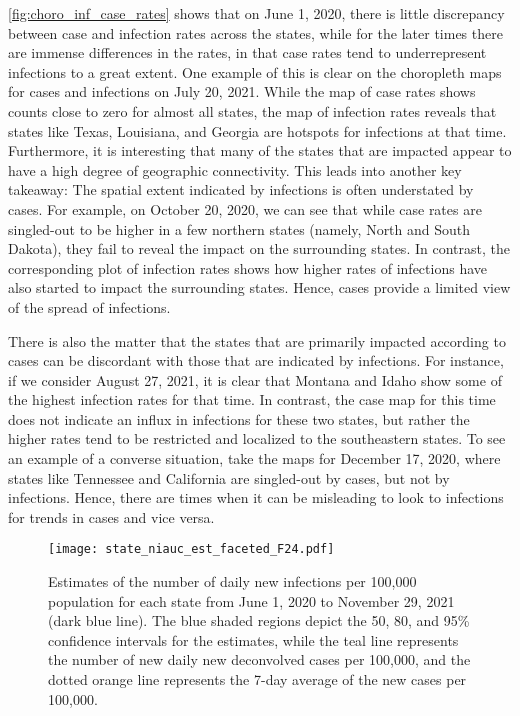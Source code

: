 \autoref{fig:choro_inf_case_rates} shows that on June 1, 2020, there is little
discrepancy between case and infection rates across the states, while for the
later times there are immense differences in the rates, in that case rates tend
to underrepresent infections to a great extent.
One example of this is clear on the choropleth maps for cases and infections on July 20, 2021. While the map of case rates shows counts close to zero for almost all states, the map of infection rates reveals that states like Texas, Louisiana, and Georgia are hotspots for infections at that time. Furthermore, it is interesting that many of the states that are impacted appear to have a high degree of geographic connectivity. 
This leads into another key takeaway: The spatial extent indicated by infections is often understated by cases. For example, on October 20, 2020, we can see that while case rates are singled-out to be higher in a few northern states (namely, North and South Dakota), they fail to reveal the impact on the surrounding states. In contrast, the corresponding plot of infection rates shows how higher rates of infections have also started to impact the surrounding states. Hence, cases provide a limited view of the spread of infections. 

There is also the matter that the states that are primarily impacted according to cases can be discordant with those that are indicated by infections. For instance, if we consider August 27, 2021, it is clear that Montana and Idaho show some of the highest infection rates for that time. In contrast, the case map for this time does not indicate an influx in infections for these two states, but rather the higher rates tend to be restricted and localized to the southeastern states. To see an example of a converse situation, take the maps for December 17, 2020, where states like Tennessee and California are singled-out by cases, but not by infections. Hence, there are times when it can be misleading to look to infections for trends in cases and vice versa.

\begin{figure}[!tb]
\centering
\texttt{[image: state\_niauc\_est\_faceted\_F24.pdf]} 
\caption{Estimates of the number of daily new infections per 100,000
population for each \US state from June 1, 2020 to November 29, 2021
(dark blue line). The blue shaded regions depict the 50, 80, and 95\%
confidence intervals for the estimates, while the teal line represents
the number of new daily new deconvolved cases per 100,000, and the
dotted orange line represents the 7-day average of the new cases per
100,000.}
\label{fig:state_infect_est}
\end{figure}


